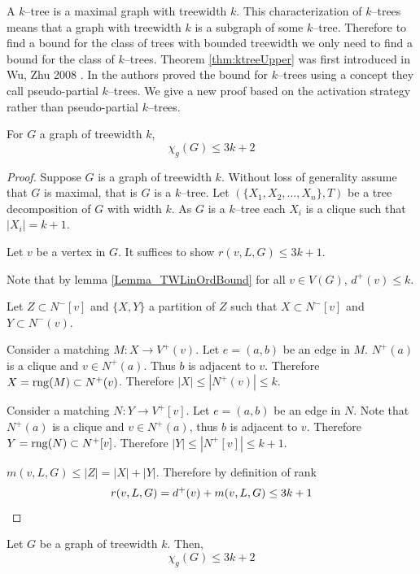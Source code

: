 
A $k$--tree is a maximal graph with treewidth $k$. This characterization of $k$--trees means that a graph with treewidth $k$ is a subgraph of some $k$--tree. Therefore to find a bound for the class of trees with bounded treewidth we only need to find a bound for the class of $k$--trees. Theorem \ref{thm:ktreeUpper} was first introduced in Wu, Zhu 2008 \cite{WuZhu2008}. In \cite{WuZhu2008} the authors proved the bound for $k$--trees using a concept they call pseudo-partial $k$--trees. We give a new proof based on the activation strategy rather than pseudo-partial $k$--trees.
\begin{theorem} \label{thm:ktreeUpper}
         For $G$ a graph of treewidth $k$,  
        \[\chi_g(G) \leq 3k + 2\]
\end{theorem}

\begin{proof}
    Suppose $G$ is a graph of treewidth $k$. Without loss of generality assume that $G$ is maximal, that is $G$ is a $k$--tree. Let $(\{X_1,X_2,\dots,X_n\},T)$ be a tree decomposition of $G$ with width $k$.
    As $G$ is a $k$--tree each $X_i$ is a clique such that $|X_i|=k+1$.
    
    Let $v$ be a vertex in $G$. It suffices to show $r(v,L,G) \leq 3k + 1$.
    
    
    Note that by lemma \ref{Lemma_TWLinOrdBound} for all $v \in V(G)$, $d^+(v) \leq k$.
    
    Let $Z \subset N^-[v]$ and $\{X,Y\}$ a partition of $Z$ such that $X\subset N^-[v]$ and $Y\subset N^-(v)$.
           
    Consider a matching $M\colon X \to V^+(v)$. Let $e=(a,b)$ be an edge in $M$.
    $N^+(a)$ is a clique and $v\in N^+(a)$. Thus $b$ is adjacent to $v$. Therefore $X =\operatorname{rng}(M)\subset N^+(v)$. Therefore $|X| \leq |N^+(v)| \leq k$. 
    
    Consider a matching $N\colon Y \to V^+[v]$. Let $e=(a,b)$ be an edge in $N$.
    Note that $N^+(a)$ is a clique and $v\in N^+(a)$, thus $b$ is adjacent to $v$. Therefore $Y =\operatorname{rng}(N)\subset N^+[v]$. Therefore $|Y| \leq |N^+[v]| \leq k+1$. 
        
    $m(v,L,G) \leq |Z| = |X|+|Y|$. Therefore by definition of rank \[r(v,L,G) = d^+(v) + m(v,L,G) \leq 3k +1 \qedhere\]        
\end{proof}

\begin{corollary}
    Let $G$ be a graph of treewidth $k$. Then, 
    \[\chi_g(G) \leq 3k + 2\]
\end{corollary}

